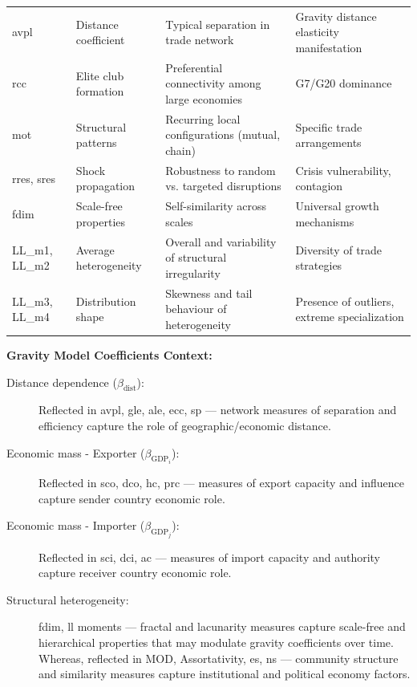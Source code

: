 \documentclass[preprint, 3p,
authoryear]{elsarticle} %
\begin{document}
\begin{longtable}{p{2.5cm}p{3cm}p{4.5cm}p{5cm}}
\gls{avpl} & Distance coefficient & Typical separation in trade network & Gravity distance elasticity manifestation \\
\addlinespace

\gls{rcc} & Elite club formation & Preferential connectivity among large economies & G7/G20 dominance \\
\addlinespace

\gls{mot} & Structural patterns & Recurring local configurations (mutual, chain) & Specific trade arrangements \\
\addlinespace

\gls{rres}, \gls{sres} & Shock propagation & Robustness to random vs. targeted disruptions & Crisis vulnerability, contagion \\
\addlinespace

\gls{fdim} & Scale-free properties & Self-similarity across scales & Universal growth mechanisms \\
\addlinespace

LL\_m1, LL\_m2 & Average heterogeneity & Overall and variability of structural irregularity & Diversity of trade strategies \\
\addlinespace

LL\_m3, LL\_m4 & Distribution shape & Skewness and tail behaviour of heterogeneity & Presence of outliers, extreme specialization \\

\bottomrule
\end{longtable}

\textbf{Gravity Model Coefficients Context:}

\begin{description}
    \item[Distance dependence ($\beta_{\text{dist}}$):] Reflected in \gls{avpl}, \gls{gle}, \gls{ale}, \gls{ecc}, \gls{sp} — network measures of separation and efficiency capture the role of geographic/economic distance. 
    \item[Economic mass - Exporter ($\beta_{\text{GDP}_i}$):] Reflected in \gls{sco}, \gls{dco}, \gls{hc}, \gls{prc} — measures of export capacity and influence capture sender country economic role.
    \item[Economic mass - Importer ($\beta_{\text{GDP}_j}$):] Reflected in \gls{sci}, \gls{dci}, \gls{ac} — measures of import capacity and authority capture receiver country economic role.
    \item[Structural heterogeneity:] \gls{fdim}, \gls{ll} moments — fractal and lacunarity measures capture scale-free and hierarchical properties that may modulate gravity coefficients over time. Whereas, reflected in MOD, Assortativity, \gls{es}, \gls{ns} — community structure and similarity measures capture institutional and political economy factors.
\end{description}
\end{document}
